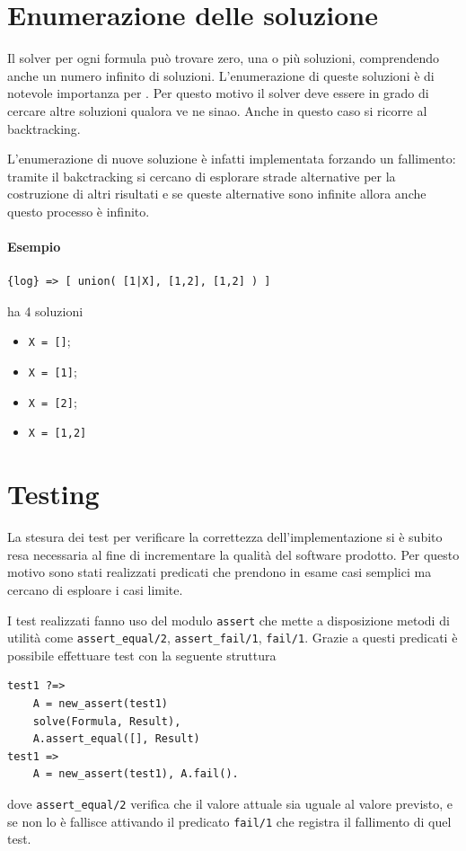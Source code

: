 \documentclass[12pt,a4paper,openright]{book} %
\begin{document}
\section{Enumerazione delle soluzione}
\label{sec:lsetpicat_solutions}

Il solver per ogni formula può trovare zero, una o più soluzioni, comprendendo anche un numero infinito di soluzioni. L'enumerazione di queste soluzioni è di notevole importanza per \lset{}. Per questo motivo il solver deve essere in grado di cercare altre soluzioni qualora ve ne sinao. Anche in questo caso si ricorre al backtracking.

L'enumerazione di nuove soluzione è infatti implementata forzando un fallimento: tramite il bakctracking si cercano di esplorare strade alternative per la costruzione di altri risultati e se queste alternative sono infinite allora anche questo processo è infinito.

\paragraph{Esempio}
\begin{verbatim}
{log} => [ union( [1|X], [1,2], [1,2] ) ]
\end{verbatim}
ha 4 soluzioni
\begin{itemize}
	\item \verb|X = []|;
	\item \verb|X = [1]|;
	\item \verb|X = [2]|;
	\item \verb|X = [1,2]|
\end{itemize}

\section{Testing}
\label{sec:lsetpicat_testing}

La stesura dei test per verificare la correttezza dell'implementazione si è subito resa necessaria al fine di incrementare la qualità del software prodotto. Per questo motivo sono stati realizzati predicati che prendono in esame casi semplici ma cercano di esploare i casi limite.

I test realizzati fanno uso del modulo \verb|assert| che mette a disposizione metodi di utilità come \verb|assert_equal/2|, \verb|assert_fail/1|, \verb|fail/1|. Grazie a questi predicati è possibile effettuare test con la seguente struttura
\begin{verbatim}
test1 ?=>
    A = new_assert(test1)
    solve(Formula, Result),
    A.assert_equal([], Result)
test1 => 
    A = new_assert(test1), A.fail().
\end{verbatim}
dove \verb|assert_equal/2| verifica che il valore attuale sia uguale al valore previsto, e se non lo è fallisce attivando il predicato \verb|fail/1| che registra il fallimento di quel test.
\end{document}
